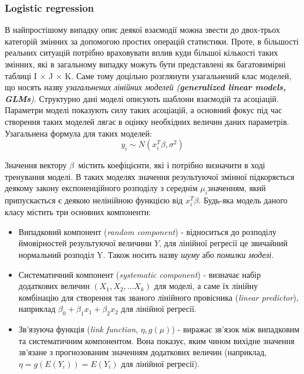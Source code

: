 \subsubsection{Logistic regression}
В найпростішому випадку опис деякої взаємодії можна звести до двох-трьох категорій змінних за допомогою простих операцій статистики. Проте, в більшості реальних ситуацій потрібно враховувати вплив куди більшої кількості таких змінних, які в загальному випадку можуть бути представлені як багатовимірні таблиці  I × J × K. Саме тому доцільно розглянути узагальнений клас моделей, що носять назву \textit{узагальнених лінійних моделей (\textbf{generalized linear models, GLMs})}. Структурно дані моделі описують шаблони взаємодій та асоціацій. Параметри моделі показують силу таких асоціацій, а основний фокус під час створення таких моделей лягає в оцінку необхідних величин даних параметрів. Узагальнена формула для таких моделей:
\begin{equation}
    \label{eq:logistic_regression}
    y_{i} \sim N(x_{i}^T\beta, \sigma^2)
\end{equation}

Значення вектору $\beta$\ містить коефіцієнти, які і потрібно визначити в ході тренування моделі. В таких моделях значення результуючої змінної підкоряється деякому закону експоненційного розподілу з середнім $\mu_{i}$значенням, який припускається є деякою нелінійною функцією від $x_{i}^T\beta$. Будь-яка модель даного класу містить три основних компоненти:
\begin{itemize}  
	\item Випадковий компонент (\textit{random component}) - відноситься до розподілу ймовірностей результуючої величини $Y$, для лінійної регресії це звичайний нормальний розподіл {Y}. Також носить назву \textit{шуму} або \textit{помилки моделі}.
	\item Систематичний компонент (\textit{systematic component}) - визначає набір додаткових величин $(X_{1}, X_{2}, \ldots X_{k})$ для моделі, а саме їх лінійну комбінацію для створення так званого лінійного провісника (\textit{linear predictor}), наприклад $\beta_{0} + \beta_{1}x_{1} + \beta_{2}x_{2}$ для лінійної регресії.
	\item Зв'язуюча функція (\textit{link function}, $\eta, g(\mu)$) - виражає зв'язок між випадковим та систематичним компонентом. Вона показує, яким чином вихідне значення зв'язане з прогнозованим значенням додаткових величин (наприклад, $\eta = g(E(Y_{i}))=E(Y_{i})$ для лінійної регресії).
\end{itemize}

